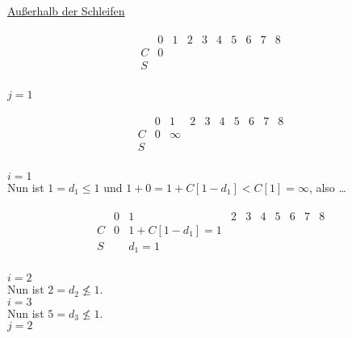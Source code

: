 \begin{solution}
\begin{enumerate}[label = \alph*]
\begin{enumerate}[label = \arabic*.]
    \underline{Außerhalb der Schleifen}

    \begin{align*}
      \begin{array}{c|c|c|c|c|c|c|c|c|c}
          & 0 & 1 & 2 & 3 & 4 & 5 & 6 & 7 & 8 \\ \hline
        C & 0 &   &   &   &   &   &   &   &   \\ \hline
        S &   &   &   &   &   &   &   &   &   \\
      \end{array}
    \end{align*}

    \underline{$j = 1$}

    \begin{align*}
      \begin{array}{c|c|c|c|c|c|c|c|c|c}
          & 0 & 1      & 2 & 3 & 4 & 5 & 6 & 7 & 8 \\ \hline
        C & 0 & \infty &   &   &   &   &   &   &   \\ \hline
        S &   &        &   &   &   &   &   &   &   \\
      \end{array}
    \end{align*}

    \underline{$i = 1$} \\
    Nun ist $1 = d_1 \leq 1$ und $1 + 0 = 1 + C[1 - d_1] < C[1] = \infty$, also …

    \begin{align*}
      \begin{array}{c|c|c|c|c|c|c|c|c|c}
          & 0 & 1                  & 2 & 3 & 4 & 5 & 6 & 7 & 8 \\ \hline
        C & 0 & 1 + C[1 - d_1] = 1 &   &   &   &   &   &   &   \\ \hline
        S &   & d_1 = 1            &   &   &   &   &   &   &   \\
      \end{array}
    \end{align*}

    \underline{$i = 2$} \\
    Nun ist $2 = d_2 \not \leq 1$. \\

    \underline{$i = 3$} \\
    Nun ist $5 = d_3 \not \leq 1$. \\

    \underline{$j = 2$} \\


\end{enumerate}
\end{enumerate}
\end{solution}
